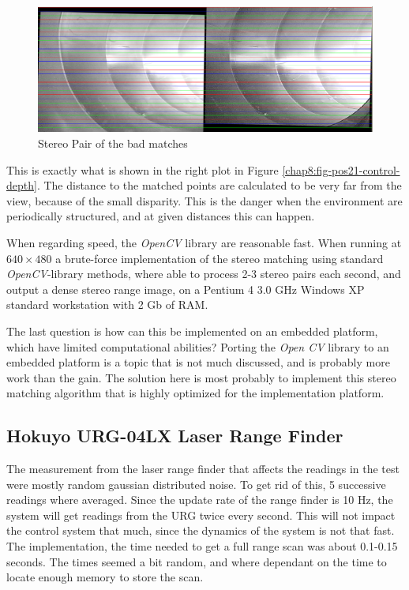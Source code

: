 \begin{figure}[htbp]
    \centering
    \includegraphics[width=\textwidth]{pics/pos21-control-rectified}
    \caption{Stereo Pair of the bad matches}
    \label{chap8:fig-pos21-control-rectified}
\end{figure}
This is exactly what is shown in the right plot in Figure
\ref{chap8:fig-pos21-control-depth}. The distance to the matched points are calculated to
be very far from the view, because of the small disparity. This is the danger when the
environment are periodically structured, and at given distances this can happen. 

When regarding speed, the \emph{OpenCV} library are reasonable fast. When running at
$640\times480$ a brute-force implementation of the stereo matching using standard
\emph{OpenCV}-library methods, where able to process 2-3 stereo pairs each second, and
output a dense stereo range image, on a Pentium 4 3.0 GHz Windows XP standard workstation
with 2 Gb of RAM. 

The last question is how can this be implemented on an embedded platform, which have limited
computational abilities? Porting the \emph{Open CV} library to an embedded platform is a
topic that is not much discussed, and is probably more work than the gain. The solution
here is most probably to implement this stereo matching algorithm that is highly optimized
for the implementation platform. 




\subsection{Hokuyo URG-04LX Laser Range Finder}
The measurement from the laser range finder that affects the readings in the test were
mostly random gaussian distributed noise. To get rid of this, 5 successive
readings where averaged. Since the update rate of the range finder is 10 Hz, the system
will get readings from the URG twice every second. This will not impact the control system
that much, since the dynamics of the system is not that fast. The implementation, the time
needed to get a full range scan was about 0.1-0.15 seconds. The times seemed a bit random,
and where dependant on the time to locate enough memory to store the scan. 

